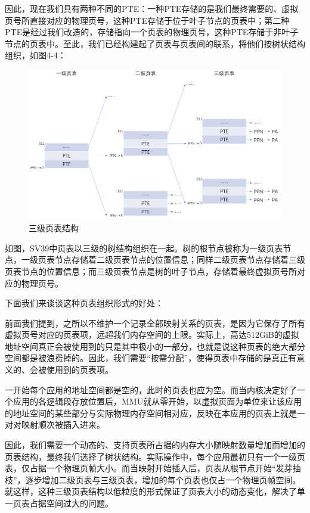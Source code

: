 因此，现在我们具有两种不同的PTE：一种PTE存储的是我们最终需要的、虚拟页号所直接对应的物理页号，这种PTE存储于位于叶子节点的页表中；第二种PTE是经过我们改造的，存储指向一个页表的物理页号，这种PTE存储于非叶子节点的页表中。至此，我们已经构建起了页表与页表间的联系，将他们按树状结构组织，如图4-4：

\begin{figure}[h]
	\centering
	\includegraphics[width=.80\textwidth]{figures/04-01-三级页表结构.png}
	\caption{三级页表结构}
\end{figure}\FloatBarrier

如图，SV39中页表以三级的树结构组织在一起。树的根节点被称为一级页表节点，一级页表节点存储着二级页表节点的位置信息；同样二级页表节点存储着三级页表节点的位置信息；而三级页表节点是树的叶子节点，存储着最终虚拟页号所对应的物理页号。

下面我们来谈谈这种页表组织形式的好处：

前面我们提到，之所以不维护一个记录全部映射关系的页表，是因为它保存了所有虚拟页号对应的页表项，远超我们内存空间的上限。实际上，高达512GiB的虚拟地址空间真正会被使用到的只是其中极小的一部分，也就是说这种页表的绝大部分空间都是被浪费掉的。因此，我们需要“按需分配”，使得页表中存储的是真正有意义的、会被使用到的页表项。

一开始每个应用的地址空间都是空的，此时的页表也应为空。而当内核决定好了一个应用的各逻辑段存放位置后，MMU就从零开始，以虚拟页面为单位来让该应用的地址空间的某些部分与实际物理内存空间相对应，反映在本应用的页表上就是一对对映射顺次被插入进来。

因此，我们需要一个动态的、支持页表所占据的内存大小随映射数量增加而增加的页表结构，最终我们选择了树状结构。实际操作中，每个应用最初只有一个一级页表，仅占据一个物理页帧大小。而当映射开始插入后，页表从根节点开始“发芽抽枝”，逐步增加二级页表与三级页表，增加的每个页表也仅占一个物理页帧空间。就这样，这种三级页表结构以低粒度的形式保证了页表大小的动态变化，解决了单一页表占据空间过大的问题。

